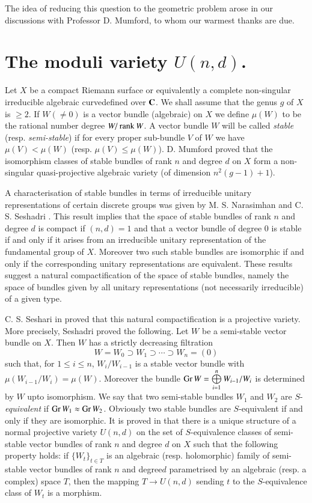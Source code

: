 The idea of reducing this question to the geometric problem arose in our discussions with Professor D. Mumford, to whom our warmest thanks are due.

\section{The moduli variety \texorpdfstring{$U(n,d)$}{Und}.}\label{art17-sec2}

Let $X$ be a compact Riemann surface or equivalently a complete non-singular irreducible algebraic curve\pageoriginale defined over $\mathbf{C}$. We shall assume that the genus $g$ of $X$ is $\geq 2$. If $W(\neq 0)$ is a vector bundle (algebraic) on $X$ we define $\mu(W)$ to be the rational number degree $W/\operatorname{\mathrm{rank}} W$. A vector bundle $W$ will be called {\em stable} (resp. {\em semi-stable}) if for every proper sub-bundle $V$ of $W$ we have $\mu(V)<\mu(W)$ (resp. $\mu(V)\leq \mu(W)$). D. Mumford proved that the isomorphism classes of stable bundles of rank $n$ and degree $d$ on $X$ form a non-singular quasi-projective algebraic variety (of dimension $n^{2}(g-1)+1$).

A characterisation of stable bundles in terms of irreducible unitary representations of certain discrete groups was given by M. S. Nara\-simhan and C. S. Seshadri \cite{art17-key4}. This result implies that the space of stable bundles of rank $n$ and degree $d$ is compact if $(n,d)=1$ and that a vector bundle of degree 0 is stable if and only if it arises from an irreducible unitary representation of the fundamental group of $X$. Moreover two such stable bundles are isomorphic if and only if the corresponding unitary representations are equivalent. These results suggest a natural compactification of the space of stable bundles, namely the space of bundles given by all unitary representations (not necessarily irreducible) of a given type.

C. S. Seshari in \cite{art17-key7} proved that this natural compactification is a projective variety. More precisely, Seshadri proved the following. Let $W$ be a semi-stable vector bundle on $X$. Then $W$ has a strictly decreasing filtration
$$
W=W_{0}\supset W_{1}\supset \cdots \supset W_{n}=(0)
$$
such that, for $1\leq i\leq n$, $W_{i}/W_{i-1}$ is a stable vector bundle with $\mu(W_{i-1}/W_{i})=\mu(W)$. Moreover the bundle $\operatorname{\mathrm{Gr}} W=\bigoplus\limits^{n}_{i=1}W_{i-1}/W_{i}$ is determined by $W$ upto isomorphism. We say that two semi-stable bundles $W_{1}$ and $W_{2}$ are $S$-{\em equivalent} if $\operatorname{\mathrm{Gr}} W_{1}\approx \operatorname{\mathrm{Gr}} W_{2}$. Obviously two stable bundles are $S$-equivalent if and only if they are isomorphic. It is proved in \cite{art17-key7} that there is a unique structure of a normal projective variety $U(n,d)$ on the set of $S$-equivalence classes of semi-stable vector bundles of rank $n$ and degree $d$ on $X$ such that the following property holds: if $\{W_{t}\}_{t\in T}$ is an algebraic (resp. holomorphic) family of semi-stable vector bundles of rank $n$ and degree\pageoriginale $d$ parametrised by an algebraic (resp. a complex) space $T$, then the mapping $T\to U(n,d)$ sending $t$ to the $S$-equivalence class of $W_{t}$ is a morphism.

